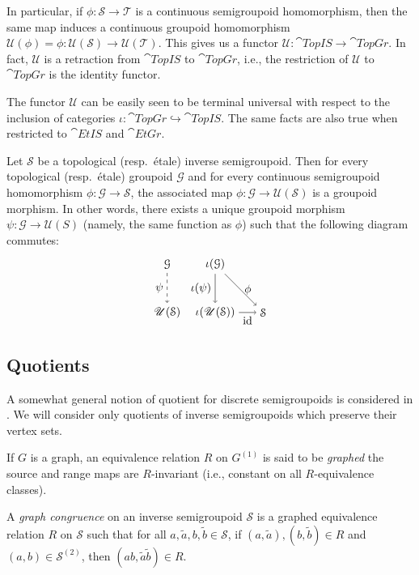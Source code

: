 In particular, if $\phi\colon\mathcal{S}\to \mathcal{T}$ is a continuous semigroupoid homomorphism, then the same map induces a continuous groupoid homomorphism $\mathscr{U}(\phi)=\phi\colon\mathscr{U}(\mathcal{S})\to\mathscr{U}(\mathcal{T})$. This gives us a functor $\mathscr{U}\colon\cat{TopIS}\to\cat{TopGr}$. In fact, $\mathscr{U}$ is a retraction from $\cat{TopIS}$ to $\cat{TopGr}$, i.e., the restriction of $\mathscr{U}$ to $\cat{TopGr}$ is the identity functor.

The functor $\mathscr{U}$ can be easily seen to be terminal universal with respect to the inclusion of categories $\iota\colon\cat{TopGr}\hookrightarrow\cat{TopIS}$. The same facts are also true when restricted to $\cat{EtIS}$ and $\cat{EtGr}$.

\begin{proposition}
Let $\mathcal{S}$ be a topological (resp.\ étale) inverse semigroupoid. Then for every topological (resp.\ étale) groupoid $\mathcal{G}$ and for every continuous semigroupoid homomorphism $\phi\colon\mathcal{G}\to\mathcal{S}$, the associated map $\phi\colon\mathcal{G}\to\mathscr{U}(\mathcal{S})$ is a groupoid morphism. In other words, there exists a unique groupoid morphism $\psi\colon\mathcal{G}\to\mathscr{U}(S)$ (namely, the same function as $\phi$) such that the following diagram commutes:
\[\begin{tikzpicture}
\node (G) at (0,0) {$\mathcal{G}$};
\node (GS) at ([shift={+(0,-1.5)}]G) {$\mathscr{U}(\mathcal{S})$};
\node (iG) at ([shift={+(1.5,0)}]G) {$\iota(\mathcal{G})$};
\node (iGS) at ([shift={+(1.5,-1.5)}]G) {$\iota(\mathscr{U}(\mathcal{S}))$};
\node (S) at ([shift={+(1.5,0)}]iGS) {$\mathcal{S}$};
\draw[->,dashed] (G)--(GS) node[left,midway] {$\psi$};
\draw[->] (iG)--(iGS) node[left,midway] {$\iota(\psi)$};
\draw[->] (iG)--(S) node[right,midway] {$\phi$};
\draw[->] (iGS)--(S) node[below,midway] {$\id$};
\end{tikzpicture}\]
\end{proposition}

\subsection{Quotients}

A somewhat general notion of quotient for discrete semigroupoids is considered in \cite{MR3597709}. We will consider only quotients of inverse semigroupoids which preserve their vertex sets.

\begin{definition}
If $G$ is a graph, an equivalence relation $R$ on $G^{(1)}$ is said to be \emph{graphed} the source and range maps are $R$-invariant (i.e., constant on all $R$-equivalence classes).

A \emph{graph congruence} on an inverse semigroupoid $\mathcal{S}$ is a graphed equivalence relation $R$ on $\mathcal{S}$ such that for all $a,\widetilde{a},b,\widetilde{b}\in \mathcal{S}$, if $(a,\widetilde{a}),(b,\widetilde{b})\in R$ and $(a,b)\in\mathcal{S}^{(2)}$, then $(ab,\widetilde{a}\widetilde{b})\in R$.
\end{definition}

